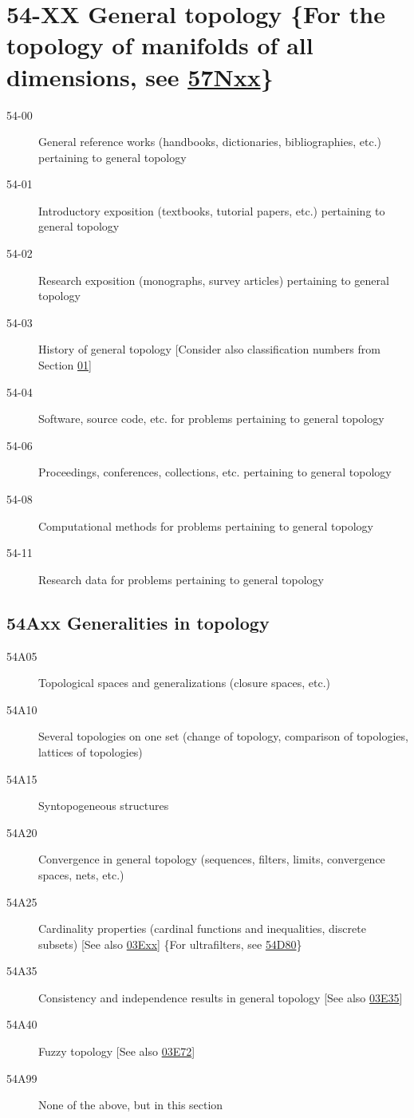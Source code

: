 \documentclass[letterpaper]{article}
\begin{document}
\section*{54-XX General topology \{For the topology of manifolds of all dimensions, see \hyperref[57Nxx]{57Nxx}\} }\label{54-XX}
\begin{description}
\item [54-00]\label{54-00} General reference works (handbooks, dictionaries, bibliographies, etc.) pertaining to general topology
\item [54-01]\label{54-01} Introductory exposition (textbooks, tutorial papers, etc.) pertaining to general topology
\item [54-02]\label{54-02} Research exposition (monographs, survey articles) pertaining to general topology
\item [54-03]\label{54-03} History of general topology [Consider also classification numbers from Section \hyperref[01-XX]{01}]
\item [54-04]\label{54-04} Software, source code, etc. for problems pertaining to general topology
\item [54-06]\label{54-06} Proceedings, conferences, collections, etc. pertaining to general topology
\item [54-08]\label{54-08} Computational methods for problems pertaining to general topology
\item [54-11]\label{54-11} Research data for problems pertaining to general topology
\end{description}
\subsection*{54Axx  Generalities in topology}\label{54Axx}
\begin{description}  
\item [54A05]\label{54A05} Topological spaces and generalizations (closure spaces, etc.)
\item [54A10]\label{54A10} Several topologies on one set (change of topology, comparison of topologies, lattices of topologies)
\item [54A15]\label{54A15} Syntopogeneous structures
\item [54A20]\label{54A20} Convergence in general topology (sequences, filters, limits, convergence spaces, nets, etc.)
\item [54A25]\label{54A25} Cardinality properties (cardinal functions and inequalities, discrete subsets) [See also \hyperref[03Exx]{03Exx}] \{For ultrafilters, see \hyperref[54D80]{54D80}\}
\item [54A35]\label{54A35} Consistency and independence results in general topology [See also \hyperref[03E35]{03E35}]
\item [54A40]\label{54A40} Fuzzy topology [See also \hyperref[03E72]{03E72}]
\item [54A99]\label{54A99} None of the above, but in this section
\end{description}
\end{document}
